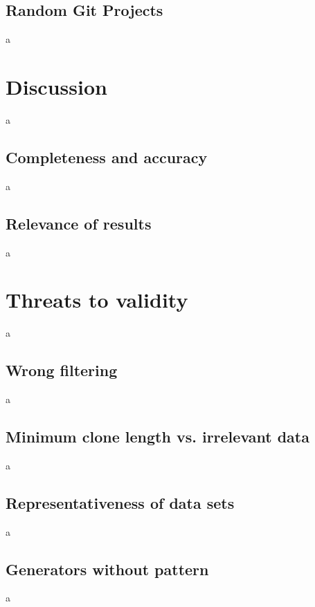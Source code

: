 \subsection{Random Git Projects}
a
\section{Discussion}
a
\subsection{Completeness and accuracy}
a
\subsection{Relevance of results}
a
\section{Threats to validity}
a
\subsection{Wrong filtering}
a
\subsection{Minimum clone length vs. irrelevant data}
a
\subsection{Representativeness of data sets}
a
\subsection{Generators without pattern}
a